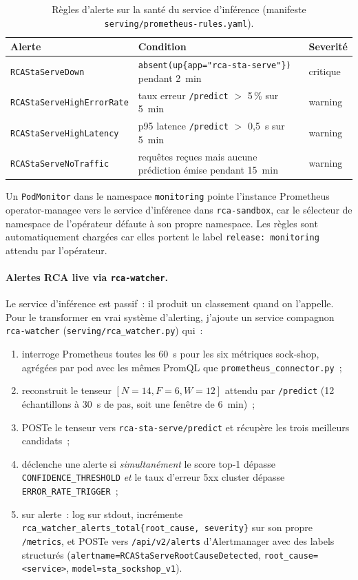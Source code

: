 \documentclass[a4paper,11pt,oneside]{report}
\begin{document}
\begin{table}[ht]
\centering
\caption{R\`egles d'alerte sur la sant\'e du service d'inf\'erence (manifeste \texttt{serving/prometheus-rules.yaml}).}
\label{tab:health-alerts}
\small
\begin{tabular}{lp{}l}
\toprule
Alerte & Condition & Severit\'e \\
\midrule
\texttt{RCAStaServeDown} & \texttt{absent(up\{app="rca-sta-serve"\})} pendant 2~min & critique \\
\texttt{RCAStaServeHighErrorRate} & taux erreur \texttt{/predict} $>$ 5\,\% sur 5~min & warning \\
\texttt{RCAStaServeHighLatency} & p95 latence \texttt{/predict} $>$ 0{,}5~s sur 5~min & warning \\
\texttt{RCAStaServeNoTraffic} & requ\^etes re\c{c}ues mais aucune pr\'ediction \'emise pendant 15~min & warning \\
\bottomrule
\end{tabular}
\end{table}

Un \texttt{PodMonitor} dans le namespace \texttt{monitoring} pointe l'instance Prometheus operator-managee vers le service d'inf\'erence dans \texttt{rca-sandbox}, car le s\'electeur de namespace de l'op\'erateur d\'efaute \`a son propre namespace. Les r\`egles sont automatiquement charg\'ees car elles portent le label \texttt{release: monitoring} attendu par l'op\'erateur.

\paragraph{Alertes RCA live via \texttt{rca-watcher}.}
Le service d'inf\'erence est passif~: il produit un classement quand on l'appelle. Pour le transformer en vrai syst\`eme d'alerting, j'ajoute un service compagnon \texttt{rca-watcher} (\texttt{serving/rca\_watcher.py}) qui~:

\begin{enumerate}
  \item interroge Prometheus toutes les 60~s pour les six m\'etriques sock-shop, agr\'eg\'ees par pod avec les m\^emes PromQL que \texttt{prometheus\_connector.py}~;
  \item reconstruit le tenseur $[N{=}14, F{=}6, W{=}12]$ attendu par \texttt{/predict} (12 \'echantillons \`a 30~s de pas, soit une fen\^etre de 6~min)~;
  \item POSTe le tenseur vers \texttt{rca-sta-serve/predict} et r\'ecup\`ere les trois meilleurs candidats~;
  \item d\'eclenche une alerte si \emph{simultan\'ement} le score top-1 d\'epasse \texttt{CONFIDENCE\_THRESHOLD} \emph{et} le taux d'erreur 5xx cluster d\'epasse \texttt{ERROR\_RATE\_TRIGGER}~;
  \item sur alerte~: log sur stdout, incr\'emente \texttt{rca\_watcher\_alerts\_total\{root\_cause, severity\}} sur son propre \texttt{/metrics}, et POSTe vers \texttt{/api/v2/alerts} d'Alertmanager avec des labels structur\'es (\texttt{alertname=RCAStaServeRootCauseDetected}, \texttt{root\_cause=<service>}, \texttt{model=sta\_sockshop\_v1}).
\end{enumerate}
\end{document}
